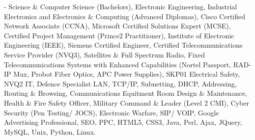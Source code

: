 \documentclass[letterpaper,10pt,english]{sphinxmanual}
\begin{document}
 - Science \& Computer Science (Bachelors), Electronic Engineering, Industrial Electronics and Electronics \& Computing (Advanced Diplomas), Cisco Certified Network Associate (CCNA), Microsoft Certified Solutions Expert (MCSE), Certified Project Management (Prince2 Practitioner), Institute of Electronic Engineering (IEEE), Siemens Certified Engineer, Certified Telecommunications Service Provider (NVQ3), Satellites \& Full Spectrum Radio, Fixed Telecommunications Systems with Enhanced Capabilities (Nortel Passport, RAD-IP Mux, Probot Fiber Optics, APC Power Supplies), SKP01 Electrical Safety, NVQ2 IT, Defence Specialist LAN, TCP/IP, Subnetting, DHCP, Addressing, Routing \& Browsing, Communications Equitment Room Design \& Maintenance, Health \& Fire Safety Officer, Military Command \& Leader (Level 2 CMI),  Cyber Security (Pen Testing/ JOCS), Electronic Warfare, SIP/ VOIP, Google Advertising Professional, SEO, PPC, HTML5, CSS3, Java, Perl, Ajax, JQuery, MySQL, Unix, Python, Linux.



\renewcommand{\indexname}{Index}
\printindex
\end{document}
